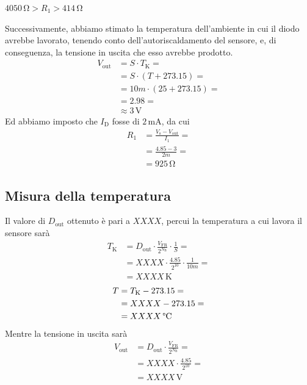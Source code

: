 \documentclass[a4paper]{article}
\begin{document}
			\begin{center}
				$ 4050 \, \mathrm{\Omega} > R_{1} > 414 \, \mathrm{\Omega} $
			\end{center}
			Successivamente, abbiamo stimato la temperatura dell'ambiente in cui il diodo avrebbe lavorato, tenendo conto dell'autoriscaldamento del sensore, e, di conseguenza, la tensione in uscita che esso avrebbe prodotto.
			\begin{equation*}
				\begin{split}
					V_{\mathrm{out}} &= S \cdot T_{\mathrm{K}} = \\
									 &= S \cdot (T + 273.15) = \\
									 &= 10m \cdot (25 + 273.15) = \\
									 &= 2.98 = \\
									 &\approx 3 \, \mathrm{V}
				\end{split}
			\end{equation*}
			Ed abbiamo imposto che $ I_{\mathrm{D}} $ fosse di $ 2 \, \mathrm{mA} $, da cui
			\begin{equation*}
				\begin{split}
					R_{1} &= \frac{V_{\mathrm{s}} - V_{\mathrm{out}}}{I_{1}} = \\
						  &= \frac{4.85 - 3}{2m} = \\
						  &= 925 \, \mathrm{\Omega}
				\end{split}
			\end{equation*}
		\subsection{Misura della temperatura} 
			Il valore di $ D_{\mathrm{out}} $ ottenuto è pari a $ XXXX $, percui la temperatura a cui lavora il sensore sarà
			\begin{equation*}
				\begin{split}
					T_{\mathrm{K}} &= D_{\mathrm{out}} \cdot \frac{V_{\mathrm{FR}}}{2^{N_{\mathrm{B}}}} \cdot \frac{1}{S} = \\
								   &= XXXX \cdot \frac{4.85}{2^{10}} \cdot \frac{1}{10m} = \\
								   &= XXXX \, \mathrm{K}
				\end{split}
			\end{equation*}
			\begin{equation*}
				\begin{split}
					T &= T_{\mathrm{K}} - 273.15 = \\
					  &= XXXX - 273.15 = \\
					  &= XXXX \, \mathrm{\text{\textdegree} C}
				\end{split}
			\end{equation*}
			Mentre la tensione in uscita sarà
			\begin{equation*}
				\begin{split}
					V_{\mathrm{out}} &= D_{\mathrm{out}} \cdot \frac{V_{\mathrm{FR}}}{2^{N_{\mathrm{B}}}} = \\
									 &= XXXX \cdot \frac{4.85}{2^{10}} = \\
									 &= XXXX \, \mathrm{V}
				\end{split}
			\end{equation*}
\end{document}
